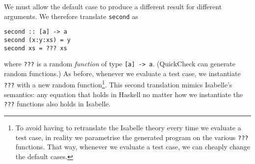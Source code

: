 We must allow the default case to produce a different result for
different arguments. We therefore translate \verb|second| as
\begin{verbatim}
second :: [a] -> a
second (x:y:xs) = y
second xs = ??? xs
\end{verbatim}
where \verb|???| is a random \emph{function} of type \verb|[a] -> a|.
(QuickCheck can generate random functions.) As before, whenever we
evaluate a test case, we instantiate \verb|???| with a new random
function\footnote{To avoid having to retranslate the Isabelle theory
every time we evaluate a test case, in reality we parametrise the
generated program on the various \texttt{???} functions. That way,
whenever we evaluate a test case, we can cheaply change the default cases.}.
This second translation mimics Isabelle's semantics: any equation that
holds in Haskell no matter how we instantiate the \verb|???| functions
also holds in Isabelle.
